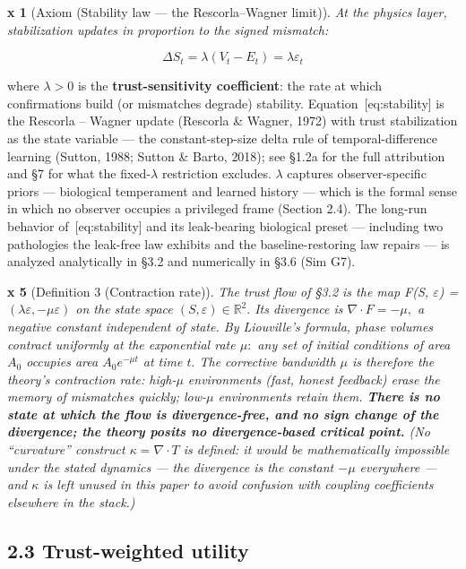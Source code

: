 \documentclass[
]{article}
\begin{document}
\textbf{x 1} (Axiom (Stability law --- the Rescorla--Wagner limit)).
\emph{At the physics layer, stabilization updates in proportion to the
signed mismatch:}

\begin{equation}
\Delta S_t = \lambda(V_t - E_t) = \lambda \varepsilon_t
\label{eq:stability}
\end{equation}

where \(\lambda > 0\) is the \textbf{trust-sensitivity coefficient}: the
rate at which confirmations build (or mismatches degrade) stability.
Equation~{[}eq:stability{]} is the Rescorla -- Wagner update (Rescorla
\& Wagner, 1972) with trust stabilization as the state variable --- the
constant-step-size delta rule of temporal-difference learning (Sutton,
1988; Sutton \& Barto, 2018); see §1.2a for the full attribution and §7
for what the fixed-\(\lambda\) restriction excludes. \(\lambda\)
captures observer-specific priors --- biological temperament and learned
history --- which is the formal sense in which no observer occupies a
privileged frame (Section 2.4). The long-run behavior
of~{[}eq:stability{]} and its leak-bearing biological preset ---
including two pathologies the leak-free law exhibits and the
baseline-restoring law repairs --- is analyzed analytically in §3.2 and
numerically in §3.6 (Sim G7).

\textbf{x 5} (Definition 3 (Contraction rate)). \emph{The trust flow of
§3.2 is the map F(S, \(\varepsilon\)) =
\((\lambda \varepsilon, -\mu \varepsilon)\) on the state space
\((S, \varepsilon) \in \mathbb{R}^{2}.\) Its divergence is
\(\nabla \cdot F = -\mu,\) a negative constant independent of state. By
Liouville's formula, phase volumes contract uniformly at the exponential
rate \(\mu:\) any set of initial conditions of area \(A_{0}\) occupies
area \(A_{0}e^{-\mu t}\) at time \(t.\) The corrective bandwidth \(\mu\)
is therefore the theory's contraction rate: high-\(\mu\) environments
(fast, honest feedback) erase the memory of mismatches quickly;
low-\(\mu\) environments retain them. \textbf{There is no state at which
the flow is divergence-free, and no sign change of the divergence; the
theory posits no divergence-based critical point.} (No ``curvature''
construct \(\kappa = \nabla \cdot T\) is defined: it would be
mathematically impossible under the stated dynamics --- the divergence
is the constant \(-\mu\) everywhere --- and \(\kappa\) is left unused in
this paper to avoid confusion with coupling coefficients elsewhere in
the stack.)}

\subsection{2.3 Trust-weighted utility}\label{trust-weighted-utility}
\end{document}
